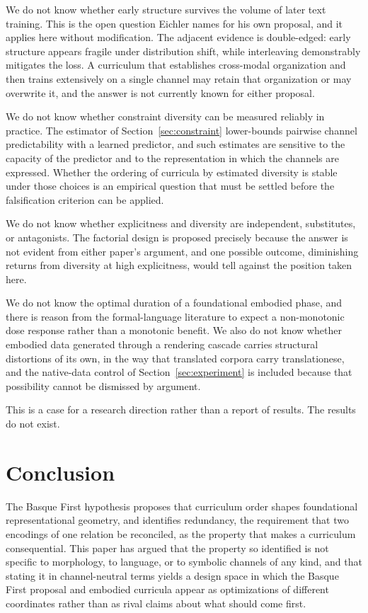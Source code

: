 \documentclass[11pt]{article}
\begin{document}
We do not know whether early structure survives the volume of later text training. This is the open question Eichler names for his own proposal, and it applies here without modification. The adjacent evidence is double-edged: early structure appears fragile under distribution shift, while interleaving demonstrably mitigates the loss. A curriculum that establishes cross-modal organization and then trains extensively on a single channel may retain that organization or may overwrite it, and the answer is not currently known for either proposal.

We do not know whether constraint diversity can be measured reliably in practice. The estimator of Section~\ref{sec:constraint} lower-bounds pairwise channel predictability with a learned predictor, and such estimates are sensitive to the capacity of the predictor and to the representation in which the channels are expressed. Whether the ordering of curricula by estimated diversity is stable under those choices is an empirical question that must be settled before the falsification criterion can be applied.

We do not know whether explicitness and diversity are independent, substitutes, or antagonists. The factorial design is proposed precisely because the answer is not evident from either paper's argument, and one possible outcome, diminishing returns from diversity at high explicitness, would tell against the position taken here.

We do not know the optimal duration of a foundational embodied phase, and there is reason from the formal-language literature to expect a non-monotonic dose response rather than a monotonic benefit. We also do not know whether embodied data generated through a rendering cascade carries structural distortions of its own, in the way that translated corpora carry translationese, and the native-data control of Section~\ref{sec:experiment} is included because that possibility cannot be dismissed by argument.

This is a case for a research direction rather than a report of results. The results do not exist.

\section{Conclusion}
\label{sec:conclusion}

The Basque First hypothesis proposes that curriculum order shapes foundational representational geometry, and identifies redundancy, the requirement that two encodings of one relation be reconciled, as the property that makes a curriculum consequential. This paper has argued that the property so identified is not specific to morphology, to language, or to symbolic channels of any kind, and that stating it in channel-neutral terms yields a design space in which the Basque First proposal and embodied curricula appear as optimizations of different coordinates rather than as rival claims about what should come first.
\end{document}
